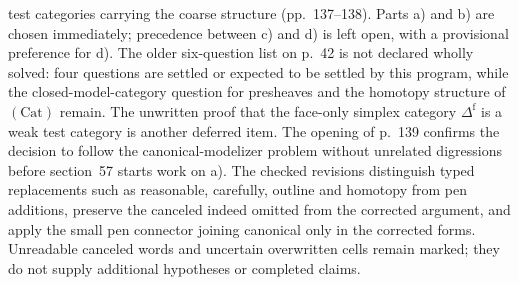 \documentclass[10pt,oneside]{book}
\begin{document}
test categories carrying the coarse structure (pp.~137--138). Parts a) and b) are chosen immediately; precedence between c) and d) is left open, with a provisional preference for d). The older six-question list on p.~42 is not declared wholly solved: four questions are settled or expected to be settled by this program, while the closed-model-category question for presheaves and the homotopy structure of $(\mathrm{Cat})$ remain. The unwritten proof that the face-only simplex category $\Delta^{\mathrm f}$ is a weak test category is another deferred item. The opening of p.~139 confirms the decision to follow the canonical-modelizer problem without unrelated digressions before section~57 starts work on a). The checked revisions distinguish typed replacements such as reasonable, carefully, outline and homotopy from pen additions, preserve the canceled indeed omitted from the corrected argument, and apply the small pen connector joining canonical only in the corrected forms. Unreadable canceled words and uncertain overwritten cells remain marked; they do not supply additional hypotheses or completed claims.
\end{document}
